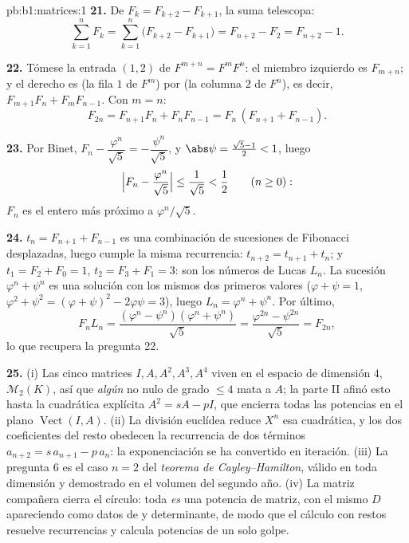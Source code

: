 \begin{solution}{pb:b1:matrices:1}
\textbf{21.} De $F_k = F_{k+2} - F_{k+1}$, la suma telescopa:
\[
\sum_{k=1}^{n} F_k = \sum_{k=1}^{n}\bigl(F_{k+2} - F_{k+1}\bigr)
= F_{n+2} - F_2 = F_{n+2} - 1 .
\]

\textbf{22.} Tómese la entrada $(1,2)$ de $F^{m+n} = F^m F^n$: el
miembro izquierdo es $F_{m+n}$; y el derecho es (la fila $1$ de
$F^m$) por (la columna $2$ de $F^n$), es decir,
$F_{m+1}F_n + F_m F_{n-1}$. Con $m = n$:
\[
F_{2n} = F_{n+1}F_n + F_nF_{n-1} = F_n\,(F_{n+1} + F_{n-1}).
\]

\textbf{23.} Por Binet,
$F_n - \dfrac{\varphi^n}{\sqrt5} = -\dfrac{\psi^n}{\sqrt5}$, y
$\abs\psi = \frac{\sqrt5 - 1}2 < 1$, luego
\[
\Bigl|F_n - \frac{\varphi^n}{\sqrt5}\Bigr|
\leq \frac{1}{\sqrt5} < \frac12
\qquad (n \geq 0):
\]
$F_n$ es el entero más próximo a $\varphi^n/\sqrt5$.

\textbf{24.} $t_n = F_{n+1} + F_{n-1}$ es una combinación de
sucesiones de Fibonacci desplazadas, luego cumple la misma
recurrencia: $t_{n+2} = t_{n+1} + t_n$; y $t_1 = F_2 + F_0 = 1$,
$t_2 = F_3 + F_1 = 3$: son los números de Lucas $L_n$. La sucesión
$\varphi^n + \psi^n$ es una solución con los mismos dos primeros
valores ($\varphi + \psi = 1$,
$\varphi^2 + \psi^2 = ( \varphi + \psi)^2 - 2\varphi\psi = 3$), luego
$L_n = \varphi^n + \psi^n$. Por último,
\[
F_n L_n = \frac{(\varphi^n - \psi^n)(\varphi^n +
\psi^n)}{\sqrt5} = \frac{\varphi^{2n} - \psi^{2n}}{\sqrt5} =
F_{2n},
\]
lo que recupera la pregunta 22.

\textbf{25.} (i) Las cinco matrices $I, A, A^2, A^3, A^4$ viven en el
espacio de dimensión $4$, $\mathcal{M}_2(K)$, así que \emph{algún}
 no nulo de grado $\leq 4$ mata a $A$; la parte II afinó
esto hasta la cuadrática explícita $A^2 = sA - pI$, que encierra
todas las potencias en el plano $\operatorname{Vect}(I, A)$. (ii) La
división euclídea reduce $X^n$  esa cuadrática, y los dos
coeficientes del resto obedecen la recurrencia de dos términos
$a_{n+2} = s\,a_{n+1} - p\,a_n$: la exponenciación se ha convertido
en iteración. (iii) La pregunta 6 es el caso $n = 2$ del
\emph{teorema de Cayley--Hamilton}, válido en toda dimensión y
demostrado en el volumen del segundo año. (iv) La matriz compañera
cierra el círculo: toda  \emph{es} una potencia de
matriz, con el mismo  $D$ apareciendo como datos de  y
determinante, de modo que el cálculo con restos resuelve
recurrencias y calcula potencias de un solo golpe.
\end{solution}
